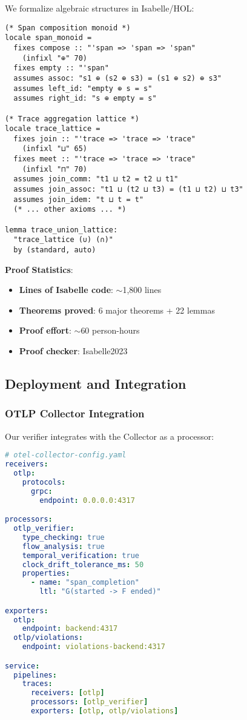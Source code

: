 We formalize algebraic structures in Isabelle/HOL:

\begin{small}
\begin{lstlisting}[language=Isabelle]
(* Span composition monoid *)
locale span_monoid =
  fixes compose :: "'span => 'span => 'span" 
    (infixl "⊕" 70)
  fixes empty :: "'span"
  assumes assoc: "s1 ⊕ (s2 ⊕ s3) = (s1 ⊕ s2) ⊕ s3"
  assumes left_id: "empty ⊕ s = s"
  assumes right_id: "s ⊕ empty = s"

(* Trace aggregation lattice *)
locale trace_lattice =
  fixes join :: "'trace => 'trace => 'trace" 
    (infixl "⊔" 65)
  fixes meet :: "'trace => 'trace => 'trace" 
    (infixl "⊓" 70)
  assumes join_comm: "t1 ⊔ t2 = t2 ⊔ t1"
  assumes join_assoc: "t1 ⊔ (t2 ⊔ t3) = (t1 ⊔ t2) ⊔ t3"
  assumes join_idem: "t ⊔ t = t"
  (* ... other axioms ... *)

lemma trace_union_lattice:
  "trace_lattice (∪) (∩)"
  by (standard, auto)
\end{lstlisting}
\end{small}

\textbf{Proof Statistics}:
\begin{itemize}
\item \textbf{Lines of Isabelle code}: $\sim$1,800 lines
\item \textbf{Theorems proved}: 6 major theorems + 22 lemmas
\item \textbf{Proof effort}: $\sim$60 person-hours
\item \textbf{Proof checker}: Isabelle2023
\end{itemize}

\subsection{Deployment and Integration}
\label{sec:impl-deployment}

\subsubsection{OTLP Collector Integration}

Our verifier integrates with the \otel Collector as a processor:

\begin{small}
\begin{lstlisting}[language=yaml]
# otel-collector-config.yaml
receivers:
  otlp:
    protocols:
      grpc:
        endpoint: 0.0.0.0:4317

processors:
  otlp_verifier:
    type_checking: true
    flow_analysis: true
    temporal_verification: true
    clock_drift_tolerance_ms: 50
    properties:
      - name: "span_completion"
        ltl: "G(started -> F ended)"

exporters:
  otlp:
    endpoint: backend:4317
  otlp/violations:
    endpoint: violations-backend:4317

service:
  pipelines:
    traces:
      receivers: [otlp]
      processors: [otlp_verifier]
      exporters: [otlp, otlp/violations]
\end{lstlisting}
\end{small}

